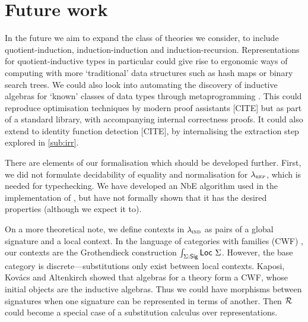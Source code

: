 \section{Future work}


In the future we aim to expand the class of theories we consider, to include
quotient-induction, induction-induction and induction-recursion. Representations
for quotient-inductive types in particular could give rise to ergonomic ways of
computing with more `traditional' data structures such as hash maps or binary
search trees. We could also look into automating the discovery of inductive algebras for
`known' classes of data types through metaprogramming \cite{Dagand2017-nj}. This
could reproduce optimisation techniques by modern proof assistants [CITE] but as
part of a standard library, with accompanying internal correctness proofs. It
could also extend to identity function detection [CITE], by internalising the
extraction step explored in \cref{sub:irr}.

There are elements of our formalisation which should be developed further.
First, we did not formulate decidability of equality and normalisation for
$\lambda_{\textsc{rep}}$, which is needed for typechecking. We have developed an NbE
algorithm used in the implementation of \superfluid, but have not formally shown
that it has the desired properties (although we expect it to).



On a more theoretical note, we define contexts in $\lambda_{\textsc{ind}}$ as pairs of a
global signature and a local context. In the language of categories with
families (CWF) \cite{Castellan2019-qo}, our contexts are the Grothendieck
construction $\int _{\Sigma : \textsf{Sig}} \textsf{Loc}\ \Sigma$. However, the base
category is discrete---substitutions only exist between local contexts. Kaposi,
Kov\'acs and Altenkirch \cite{Kaposi2019-pj} showed that algebras for a theory
form a CWF, whose initial objects are the inductive algebras. Thus we could have
morphisms between signatures when one signature can be represented in terms of
another. Then $\mathcal{R}$ could become a special case of a substitution calculus over
representations.

